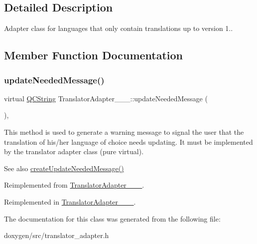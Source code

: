 \subsection{Detailed Description}
Adapter class for languages that only contain translations up to version 1.. 

\subsection{Member Function Documentation}
\mbox{\label{class_translator_adapter__1__5__4_a587a31dad925e47f206b6a0cda9eedd0}} 
\subsubsection{\texorpdfstring{updateNeededMessage()}{updateNeededMessage()}}
{\footnotesize\ttfamily virtual \mbox{\hyperlink{class_q_c_string}{Q\+C\+String}} Translator\+Adapter\+\_\+\_\+\_\+::update\+Needed\+Message (\begin{DoxyParamCaption}{ }\end{DoxyParamCaption})\hspace{0.3cm}{\ttfamily [inline]}, {\ttfamily [virtual]}}

This method is used to generate a warning message to signal the user that the translation of his/her language of choice needs updating. It must be implemented by the translator adapter class (pure virtual).

\begin{DoxySeeAlso}{See also}
\mbox{\hyperlink{class_translator_adapter_base_a71493b87a34d6e4c232e540734aba698}{create\+Update\+Needed\+Message()}} 
\end{DoxySeeAlso}


Reimplemented from \mbox{\hyperlink{class_translator_adapter__1__6__0_abc231eb2c1864ca9f878e7e5deb94f54}{Translator\+Adapter\+\_\+\_\+\_}}.



Reimplemented in \mbox{\hyperlink{class_translator_adapter__1__4__6_ab19b01d4e00c95ef1e6eb631fbe6ada4}{Translator\+Adapter\+\_\+\_\+\_}}.



The documentation for this class was generated from the following file\+:\begin{DoxyCompactItemize}
\item 
doxygen/src/translator\+\_\+adapter.\+h\end{DoxyCompactItemize}
